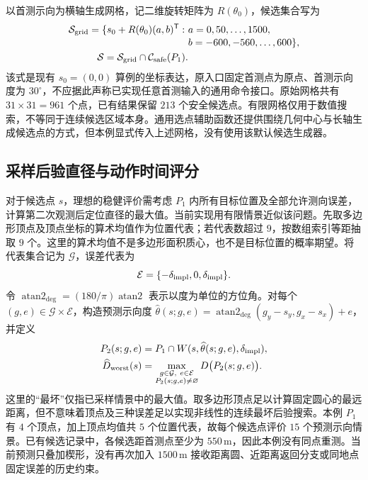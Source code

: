 以首测示向为横轴生成网格，记二维旋转矩阵为 $R(\theta_0)$，候选集合写为
\begin{equation}
 \begin{split}
 \mathcal S_{\rm grid}=
 \{s_0+R(\theta_0)(a,b)^{\mathsf T}:\ &a=0,50,\ldots,1500,\\[-2pt]
                                      &b=-600,-560,\ldots,600\},\\
 \mathcal S=\mathcal S_{\rm grid}\cap\mathcal C_{\rm safe}(P_1).
 \end{split}
 \label{eq:q2-grid}
\end{equation}
该式是现有 $s_0=(0,0)$ 算例的坐标表达，原入口固定首测点为原点、首测示向度为 $30^\circ$，不应据此声称已实现任意首测输入的通用命令接口。原始网格共有 $31\times31=961$ 个点，已有结果保留 $213$ 个安全候选点。有限网格仅用于数值搜索，不等同于连续候选区域本身。通用选点辅助函数还提供围绕几何中心与长轴生成候选点的方式，但本例显式传入上述网格，没有使用该默认候选生成器。

\subsection{采样后验直径与动作时间评分}
对于候选点 $s$，理想的稳健评价需考虑 $P_1$ 内所有目标位置及全部允许测向误差，计算第二次观测后定位直径的最大值。当前实现用有限情景近似该问题。先取多边形顶点及顶点坐标的算术均值作为位置代表；若代表数超过 $9$，按数组索引等距抽取 $9$ 个。这里的算术均值不是多边形面积质心，也不是目标位置的概率期望。将代表集合记为 $\mathcal G$，误差代表为
\begin{equation}
 \mathcal E=\{-\delta_{\rm impl},0,\delta_{\rm impl}\}.
\end{equation}
令 $\operatorname{atan2}_{\deg}=(180/\pi)\operatorname{atan2}$ 表示以度为单位的方位角。对每个 $(g,e)\in\mathcal G\times\mathcal E$，构造预测示向度
$\widehat\theta(s;g,e)=\operatorname{atan2}_{\deg}(g_y-s_y,g_x-s_x)+e$，并定义
\begin{equation}
 \begin{split}
 P_2(s;g,e)&=P_1\cap W(s,\widehat\theta(s;g,e),\delta_{\rm impl}),\\
 \widehat D_{\rm worst}(s)&=
 \max_{\substack{g\in\mathcal G,\ e\in\mathcal E\\P_2(s;g,e)\ne\varnothing}}
 D\bigl(P_2(s;g,e)\bigr).
 \end{split}
 \label{eq:q2-sampled}
\end{equation}
这里的“最坏”仅指已采样情景中的最大值。取多边形顶点足以计算固定圆心的最远距离，但不意味着顶点及三种误差足以实现非线性的连续最坏后验搜索。本例 $P_1$ 有 $4$ 个顶点，加上顶点均值共 $5$ 个位置代表，故每个候选点评价 $15$ 个预测示向情景。已有候选记录中，各候选距首测点至少为 $550\,\mathrm m$，因此本例没有同点重测。当前预测只叠加楔形，没有再次加入 $1500\,\mathrm m$ 接收距离圆、近距离返回分支或同地点固定误差的历史约束。

